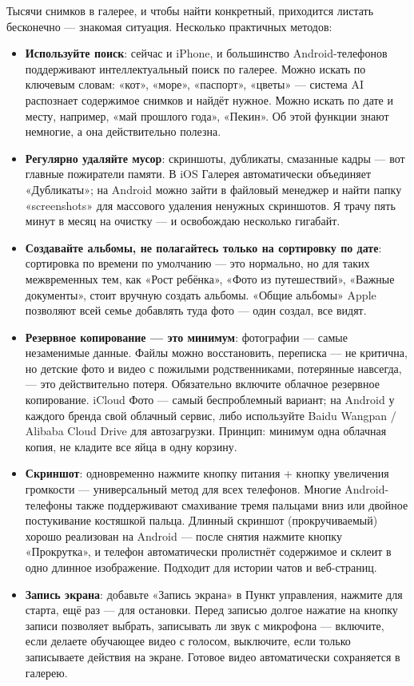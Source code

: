 
Тысячи снимков в галерее, и чтобы найти конкретный, приходится листать бесконечно — знакомая ситуация. Несколько практичных методов:

\begin{itemize}
  \item \textbf{Используйте поиск}: сейчас и iPhone, и большинство Android-телефонов поддерживают интеллектуальный поиск по галерее. Можно искать по ключевым словам: «кот», «море», «паспорт», «цветы» — система AI распознает содержимое снимков и найдёт нужное. Можно искать по дате и месту, например, «май прошлого года», «Пекин». Об этой функции знают немногие, а она действительно полезна.
  \item \textbf{Регулярно удаляйте мусор}: скриншоты, дубликаты, смазанные кадры — вот главные пожиратели памяти. В iOS Галерея автоматически объединяет «Дубликаты»; на Android можно зайти в файловый менеджер и найти папку «screenshots» для массового удаления ненужных скриншотов. Я трачу пять минут в месяц на очистку — и освобождаю несколько гигабайт.
  \item \textbf{Создавайте альбомы, не полагайтесь только на сортировку по дате}: сортировка по времени по умолчанию — это нормально, но для таких межвременных тем, как «Рост ребёнка», «Фото из путешествий», «Важные документы», стоит вручную создать альбомы. «Общие альбомы» Apple позволяют всей семье добавлять туда фото — один создал, все видят.
  \item \textbf{Резервное копирование — это минимум}: фотографии — самые незаменимые данные. Файлы можно восстановить, переписка — не критична, но детские фото и видео с пожилыми родственниками, потерянные навсегда, — это действительно потеря. Обязательно включите облачное резервное копирование. iCloud Фото — самый беспроблемный вариант; на Android у каждого бренда свой облачный сервис, либо используйте Baidu Wangpan / Alibaba Cloud Drive для автозагрузки. Принцип: минимум одна облачная копия, не кладите все яйца в одну корзину.
\end{itemize}


\begin{itemize}
  \item \textbf{Скриншот}: одновременно нажмите кнопку питания + кнопку увеличения громкости — универсальный метод для всех телефонов. Многие Android-телефоны также поддерживают смахивание тремя пальцами вниз или двойное постукивание костяшкой пальца. Длинный скриншот (прокручиваемый) хорошо реализован на Android — после снятия нажмите кнопку «Прокрутка», и телефон автоматически пролистнёт содержимое и склеит в одно длинное изображение. Подходит для истории чатов и веб-страниц.
  \item \textbf{Запись экрана}: добавьте «Запись экрана» в Пункт управления, нажмите для старта, ещё раз — для остановки. Перед записью долгое нажатие на кнопку записи позволяет выбрать, записывать ли звук с микрофона — включите, если делаете обучающее видео с голосом, выключите, если только записываете действия на экране. Готовое видео автоматически сохраняется в галерею.
\end{itemize}

